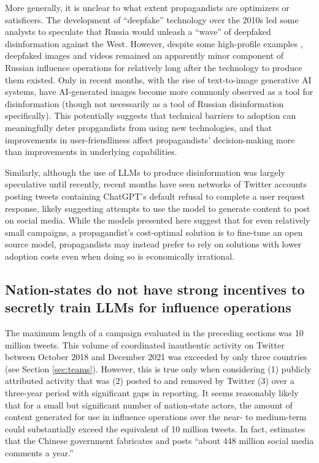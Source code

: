 \documentclass{article}
\begin{document}
More generally, it is unclear to what extent propagandists are optimizers or satisficers. The development of ``deepfake'' technology over the 2010s led some analysts to speculate that Russia would unleash a ``wave'' of deepfaked disinformation against the West. \cite{wave} However, despite some high-profile examples \cite{zelenskyy}, deepfaked images and videos remained an apparently minor component of Russian influence operations for relatively long after the technology to produce them existed. Only in recent months, with the rise of text-to-image generative AI systems, have AI-generated images become more commonly observed as a tool for disinformation (though not necessarily as a tool of Russian disinformation specifically). \cite{trump, putin} This potentially suggests that technical barriers to adoption can meaningfully deter propgandists from using new technologies, and that improvements in user-friendliness affect propagandists' decision-making more than improvements in underlying capabilities. 

Similarly, although the use of LLMs to produce disinformation was largely speculative until recently, recent months have seen networks of Twitter accounts posting tweets containing ChatGPT's default refusal to complete a user request response, likely suggesting attempts to use the model to generate content to post on social media. \cite{conspirator} While the models presented here suggest that for even relatively small campaigns, a propagandist's cost-optimal solution is to fine-tune an open source model, propagandists may instead prefer to rely on solutions with lower adoption costs even when doing so is economically irrational. 

\subsection{Nation-states do not have strong incentives to secretly train LLMs for influence operations}

The maximum length of a campaign evaluated in the preceding sections was 10 million tweets. This volume of coordinated inauthentic activity on Twitter between October 2018 and December 2021 was exceeded by only three countries (see Section \ref{sec:teams}). However, this is true only when considering (1) publicly attributed activity that was (2) posted to and removed by Twitter (3) over a three-year period with significant gaps in reporting. It seems reasonably likely that for a small but significant number of nation-state actors, the amount of content generated for use in influence operations over the near- to medium-term could substantially exceed the equivalent of 10 million tweets. In fact, \cite{king} estimates that the Chinese government fabricates and posts ``about 448 million social media comments a year.'' 
\end{document}
